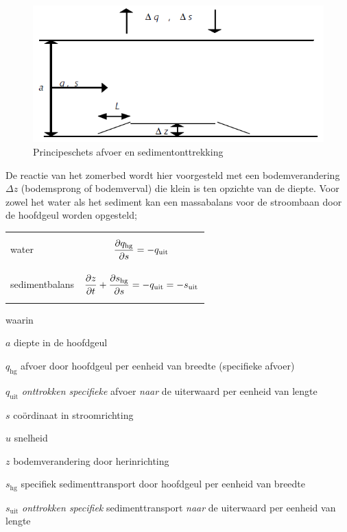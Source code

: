 \begin{figure}
\includegraphics[width=\columnwidth]{figures/Fig4.png}
\caption{Principeschets afvoer en sedimentonttrekking}
\label{Fig4}
\end{figure}

De reactie van het zomerbed wordt hier voorgesteld met een bodemverandering $\Delta z$  (bodemsprong of bodemverval) die klein is ten opzichte van de diepte.
Voor zowel het water als het sediment kan een massabalans voor de stroombaan door de hoofdgeul worden opgesteld;

\begin{tabular}{p{3cm}p{\textwidth-3cm}}
water & \parbox{\textwidth-4cm}{\begin{equation}
\pdiff{q_\text{hg}}{s} = -q_\text{uit}
\end{equation}} \\
sedimentbalans & \parbox{\textwidth-4cm}{\begin{equation}
\pdiff{z}{t} + \pdiff{s_\text{hg}}{s}= -q_\text{uit} = -s_\text{uit}
\end{equation}} \\
\end{tabular}

waarin

\begin{symbollist}
\item[$a$]  diepte in de hoofdgeul
\item[$q_\text{hg}$]  afvoer door hoofdgeul per eenheid van breedte (specifieke afvoer)
\item[$q_\text{uit}$]  \emph{onttrokken specifieke} afvoer \emph{naar} de uiterwaard per eenheid van
lengte
\item[$s$]  co\"ordinaat in stroomrichting
\item[$u$]  snelheid
\item[$z$]  bodemverandering door herinrichting
\item[$s_\text{hg}$]  specifiek sedimenttransport door hoofdgeul per eenheid van breedte
\item[$s_\text{uit}$]  \emph{onttrokken specifiek} sedimenttransport \emph{naar} de uiterwaard per eenheid van lengte
\end{symbollist}


